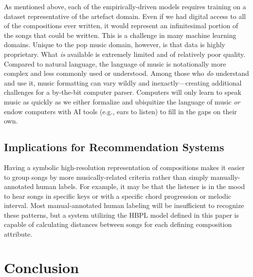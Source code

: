 \documentclass[letterpaper]{article}
\begin{document}
As mentioned above, each of the empirically-driven models requires training on a dataset representative of the artefact domain. Even if we had digital access to all of the compositions ever written, it would represent an infinitesimal portion of the songs that could be written. This is a challenge in many machine learning domains. Unique to the pop music domain, however, is that data is highly proprietary. What \textit{is} available is extremely limited and of relatively poor quality. Compared to natural language, the language of music is notationally more complex and less commonly used or understood. Among those who \textit{do} understand and use it, music formatting can vary wildly and inexactly---creating additional challenges for a by-the-bit computer parser. Computers will only learn to speak music as quickly as we either formalize and ubiquitize the language of music \textit{or} endow computers with AI tools (e.g., ears to listen) to fill in the gaps on their own.

\subsection{Implications for Recommendation Systems}

Having a symbolic high-resolution representation of compositions makes it easier to group songs by more musically-related criteria rather than simply manually-annotated human labels. For example, it may be that the listener is in the mood to hear songs in specific keys or with a specific chord progression or melodic interval. Most manual-annotated human labeling will be insufficient to recognize these patterns, but a system utilizing the HBPL model defined in this paper is capable of calculating distances between songs for each defining composition attribute.

\section{Conclusion}



\end{document}
